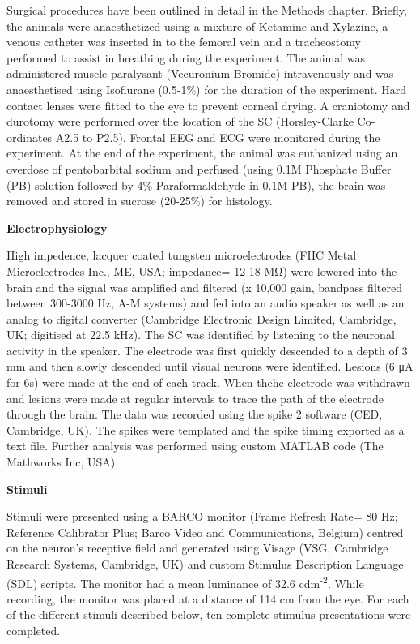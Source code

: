 Surgical procedures have been outlined in detail in the Methods chapter.
Briefly, the animals were anaesthetized using a mixture of Ketamine and
Xylazine, a venous catheter was inserted in to the femoral vein and a
tracheostomy performed to assist in breathing during the experiment. The
animal was administered muscle paralysant (Vecuronium Bromide)
intravenously and was anaesthetised using Isoflurane (0.5-1\%) for the
duration of the experiment. Hard contact lenses were fitted to the eye
to prevent corneal drying. A craniotomy and durotomy were performed over
the location of the SC (Horsley-Clarke Co-ordinates A2.5 to P2.5).
Frontal EEG and ECG were monitored during the experiment. At the end of
the experiment, the animal was euthanized using an overdose of
pentobarbital sodium and perfused (using 0.1M Phosphate Buffer (PB)
solution followed by 4\% Paraformaldehyde in 0.1M PB), the brain was
removed and stored in sucrose (20-25\%) for histology.

\textbf{Electrophysiology}

High impedence, lacquer coated tungsten microelectrodes (FHC Metal
Microelectrodes Inc., ME, USA; impedance= 12-18 MΩ) were lowered into
the brain and the signal was amplified and filtered (x 10,000 gain,
bandpass filtered between 300-3000 Hz, A-M systems) and fed into an
audio speaker as well as an analog to digital converter (Cambridge
Electronic Design Limited, Cambridge, UK; digitised at 22.5 kHz). The SC
was identified by listening to the neuronal activity in the speaker. The
electrode was first quickly descended to a depth of 3 mm and then slowly
descended until visual neurons were identified. Lesions (6 μA for 6s)
were made at the end of each track. When thehe electrode was withdrawn
and lesions were made at regular intervals to trace the path of the
electrode through the brain. The data was recorded using the spike 2
software (CED, Cambridge, UK). The spikes were templated and the spike
timing exported as a text file. Further analysis was performed using
custom MATLAB code (The Mathworks Inc, USA).

\textbf{Stimuli}

Stimuli were presented using a BARCO monitor (Frame Refresh Rate= 80 Hz;
Reference Calibrator Plus; Barco Video and Communications, Belgium)
centred on the neuron's receptive field and generated using Visage (VSG,
Cambridge Research Systems, Cambridge, UK) and custom Stimulus
Description Language (SDL) scripts. The monitor had a mean luminance of
32.6 cdm\textsuperscript{-2}. While recording, the monitor was placed at
a distance of 114 cm from the eye. For each of the different stimuli
described below, ten complete stimulus presentations were completed.

